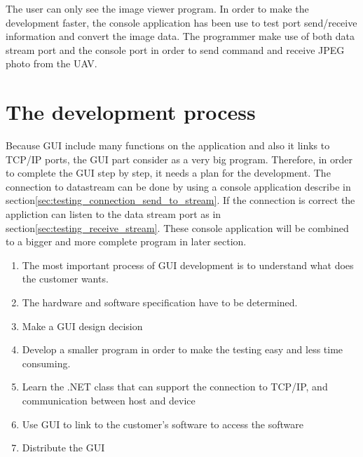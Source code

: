 \label{chap:implementation_ground_station }

The user can only see the image viewer program.
In order to make the development faster, the console application has been use to test port send/receive information and convert the image data.
The programmer make use of both data stream port and the console port in order to send command and receive JPEG photo from the UAV.

\section{The development process} 
Because GUI include many functions on the application and also it links to TCP/IP ports, the GUI part consider as a very big program. 
Therefore, in order to complete the GUI step by step, it needs a plan for the development.
The connection to datastream can be done by using a console application describe in section\ref{sec:testing_connection_send_to_stream}.
If the connection is correct the appliction can listen to the data stream port as in section\ref{sec:testing_receive_stream}.
These console application will be combined to a bigger and more complete program in later section.

\flushleft
\begin{enumerate}


\item	The most important process of GUI development is to understand what does the customer wants. 

\item	The hardware and software specification have to be determined.
 
\item	Make a GUI design decision

\item Develop a smaller program in order to make the testing easy and less time consuming. 

\item	Learn the .NET class that can support the connection to TCP/IP, and communication between host and device

\item	Use GUI to link to the customer’s software to access the software

\item	Distribute the GUI
\end{enumerate}

